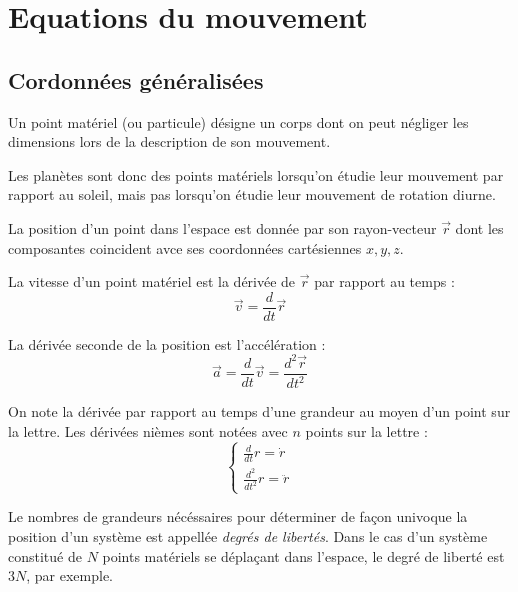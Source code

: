 \chapter{Equations du mouvement}
\section{Cordonnées généralisées}

\begin{definition}
    Un point matériel (ou particule) désigne un corps dont on peut négliger les dimensions lors de la description de son mouvement.
    \begin{eg}[Exemples]
        Les planètes sont donc des points matériels lorsqu'on étudie leur mouvement par rapport au soleil, mais pas lorsqu'on étudie leur mouvement de rotation diurne. 
    \end{eg} 
\end{definition}

\begin{definition}[Position]
    La position d'un point dans l'espace est donnée par son rayon-vecteur \(\vec{r}\) dont les composantes coincident avce ses coordonnées cartésiennes \(x,y,z\).   
\end{definition}
\begin{definition}[La vitesse]
    La vitesse d'un point matériel est la dérivée de \(\vec{r}\) par rapport au temps : 
    \[
        \vec{v} = \frac{d}{dt}\vec{r}
    \] 
\end{definition}
\begin{definition}[Accélération]
    La dérivée seconde de la position est l'accélération : 
    \[
        \vec{a} = \frac{d}{dt}\vec{v} = \frac{d^{2}\vec{r}}{dt^{2}}
    \]
\end{definition}

\begin{notation}
    On note la dérivée par rapport au temps d'une grandeur au moyen d'un point sur la lettre. Les dérivées nièmes sont notées avec \(n\) points sur la lettre : 
    \[
        \begin{cases}
            \frac{d}{dt}r = \dot{r} \\
            \frac{d^{2}}{dt^{2}}r = \ddot{r}
        \end{cases}
    \]
\end{notation}

\begin{definition}
    Le nombres de grandeurs nécéssaires pour déterminer de façon univoque la position d'un système est appellée \textit{degrés de libertés}. Dans le cas d'un système constitué de \(N\) points matériels se déplaçant dans l'espace, le degré de liberté est \(3N\), par exemple. 
\end{definition}

